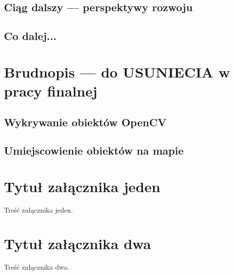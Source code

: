 \documentclass[openright]{xmgr}
\begin{document}
\section{Ciąg dalszy --- perspektywy rozwoju}
\section{Co dalej...}

\chapter{Brudnopis --- do USUNIECIA w pracy finalnej}


\section{Wykrywanie obiektów OpenCV\cite{LearnOpenCV}}


\section{Umiejscowienie obiektów na mapie}


\appendix
\chapter{Tytuł załącznika jeden}

Treść załącznika jeden.

\chapter{Tytuł załącznika dwa}

Treść załącznika dwa.




\listoftables

\listoffigures
\oswiadczenie
\end{document}
